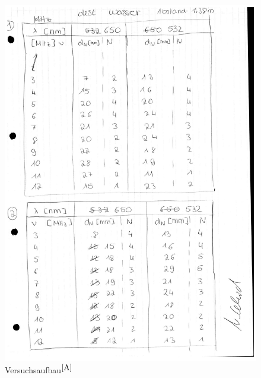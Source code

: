 \documentclass[fontsize=12pt]{scrartcl}
\begin{document}
\begin{figure}[h]
\includegraphics[scale=0.8]{Graphik/S12b}
\caption{Versuchsaufbau$^{\cite{A}}$}
\end{figure}
\newpage
\end{document}
